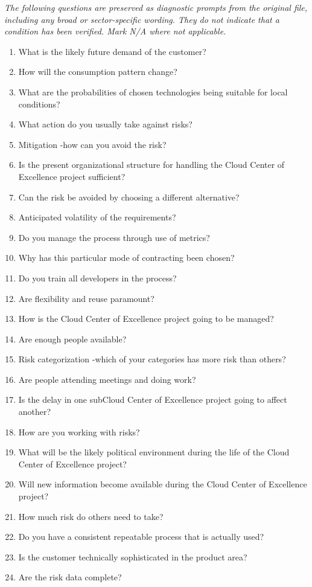 \documentclass[10pt,letterpaper]{article}
\newcommand{\docsection}[1]{\par\Needspace{5\baselineskip}\vspace{8pt}{\large\sffamily\bfseries\color{navy}#1}\par\vspace{2pt}{\color{rulegrey}\rule{\linewidth}{.6pt}}\par}
\begin{document}
\docsection{03 \quad Source diagnostic checklist}
\textit{The following questions are preserved as diagnostic prompts from the original file, including any broad or sector-specific wording. They do not indicate that a condition has been verified. Mark N/A where not applicable.}
\begingroup\small\begin{enumerate}[leftmargin=2.1em, itemsep=4pt]
\item[1.] What is the likely future demand of the customer?
\item[2.] How will the consumption pattern change?
\item[3.] What are the probabilities of chosen technologies being suitable for local conditions?
\item[4.] What action do you usually take against risks?
\item[5.] Mitigation -how can you avoid the risk?
\item[6.] Is the present organizational structure for handling the Cloud Center of Excellence project sufficient?
\item[7.] Can the risk be avoided by choosing a different alternative?
\item[8.] Anticipated volatility of the requirements?
\item[9.] Do you manage the process through use of metrics?
\item[10.] Why has this particular mode of contracting been chosen?
\item[11.] Do you train all developers in the process?
\item[12.] Are flexibility and reuse paramount?
\item[13.] How is the Cloud Center of Excellence project going to be managed?
\item[14.] Are enough people available?
\item[15.] Risk categorization -which of your categories has more risk than others?
\item[16.] Are people attending meetings and doing work?
\item[17.] Is the delay in one subCloud Center of Excellence project going to affect another?
\item[18.] How are you working with risks?
\item[19.] What will be the likely political environment during the life of the Cloud Center of Excellence project?
\item[20.] Will new information become available during the Cloud Center of Excellence project?
\item[21.] How much risk do others need to take?
\item[22.] Do you have a consistent repeatable process that is actually used?
\item[23.] Is the customer technically sophisticated in the product area?
\item[24.] Are the risk data complete?
\end{enumerate}\endgroup
\end{document}
